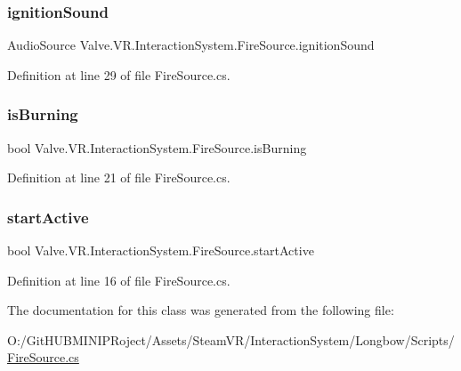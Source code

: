 \subsubsection{\texorpdfstring{ignitionSound}{ignitionSound}}
{\footnotesize\ttfamily Audio\+Source Valve.\+V\+R.\+Interaction\+System.\+Fire\+Source.\+ignition\+Sound}



Definition at line 29 of file Fire\+Source.\+cs.

\mbox{\label{class_valve_1_1_v_r_1_1_interaction_system_1_1_fire_source_a533abd233b96d3f75164bc913e4e30b8}} 
\subsubsection{\texorpdfstring{isBurning}{isBurning}}
{\footnotesize\ttfamily bool Valve.\+V\+R.\+Interaction\+System.\+Fire\+Source.\+is\+Burning}



Definition at line 21 of file Fire\+Source.\+cs.

\mbox{\label{class_valve_1_1_v_r_1_1_interaction_system_1_1_fire_source_a6d745cf0cbeaf3781eb895dab6733a72}} 
\subsubsection{\texorpdfstring{startActive}{startActive}}
{\footnotesize\ttfamily bool Valve.\+V\+R.\+Interaction\+System.\+Fire\+Source.\+start\+Active}



Definition at line 16 of file Fire\+Source.\+cs.



The documentation for this class was generated from the following file\+:\begin{DoxyCompactItemize}
\item 
O\+:/\+Git\+H\+U\+B\+M\+I\+N\+I\+P\+Roject/\+Assets/\+Steam\+V\+R/\+Interaction\+System/\+Longbow/\+Scripts/\mbox{\hyperlink{_fire_source_8cs}{Fire\+Source.\+cs}}\end{DoxyCompactItemize}

